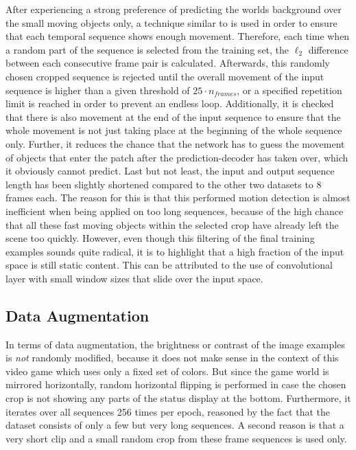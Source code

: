 After experiencing a strong preference of predicting the worlds background over the small moving objects only, a technique similar to \parencite{deep_multiscale_video_pred} is used in order to ensure that each temporal sequence shows enough movement. Therefore, each time when a random part of the sequence is selected from the training set, the $\ell_2$ difference between each consecutive frame pair is calculated. Afterwards, this randomly chosen cropped sequence is rejected until the overall movement of the input sequence is higher than a given threshold of $25 \cdot n_{frames}$, or a specified repetition limit is reached in order to prevent an endless loop. Additionally, it is checked that there is also movement at the end of the input sequence to ensure that the whole movement is not just taking place at the beginning of the whole sequence only. Further, it reduces the chance that the network has to guess the movement of objects that enter the patch after the prediction-decoder has taken over, which it obviously cannot predict. Last but not least, the input and output sequence length has been slightly shortened compared to the other two datasets to \num{8} frames each. The reason for this is that this performed motion detection is almost inefficient when being applied on too long sequences, because of the high chance that all these fast moving objects within the selected crop have already left the scene too quickly. However, even though this filtering of the final training examples sounds quite radical, it is to highlight that a high fraction of the input space is still static content. This can be attributed to the use of convolutional layer with small window sizes that slide over the input space.

\subsection{Data Augmentation}

In terms of data augmentation, the brightness or contrast of the image examples is \textit{not} randomly modified, because it does not make sense in the context of this video game which uses only a fixed set of colors. But since the game world is mirrored horizontally, random horizontal flipping is performed in case the chosen crop is not showing any parts of the status display at the bottom. Furthermore, it iterates over all sequences \num{256} times per epoch, reasoned by the fact that the dataset consists of only a few but very long sequences. A second reason is that a very short clip and a small random crop from these frame sequences is used only. 


